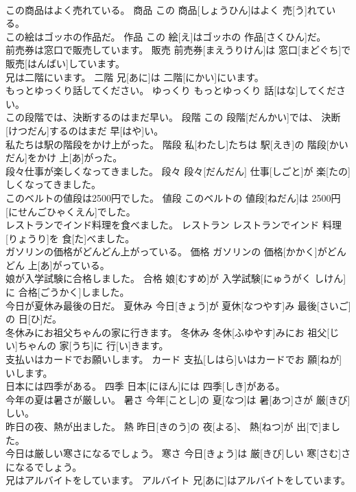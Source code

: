 \documentclass[8pt]{extreport}
\begin{document}
\begin{CJK}{UTF8}{min}
\\	この商品はよく売れている。	商品	この 商品[しょうひん]はよく 売[う]れている。	
\\	この絵はゴッホの作品だ。	作品	この 絵[え]はゴッホの 作品[さくひん]だ。	
\\	前売券は窓口で販売しています。	販売	前売券[まえうりけん]は 窓口[まどぐち]で 販売[はんばい]しています。	
\\	兄は二階にいます。	二階	兄[あに]は 二階[にかい]にいます。	
\\	もっとゆっくり話してください。	ゆっくり	もっとゆっくり 話[はな]してください。	
\\	この段階では、決断するのはまだ早い。	段階	この 段階[だんかい]では、 決断[けつだん]するのはまだ 早[はや]い。	
\\	私たちは駅の階段をかけ上がった。	階段	私[わたし]たちは 駅[えき]の 階段[かいだん]をかけ 上[あ]がった。	
\\	段々仕事が楽しくなってきました。	段々	段々[だんだん] 仕事[しごと]が 楽[たの]しくなってきました。	
\\	このベルトの値段は2500円でした。	値段	このベルトの 値段[ねだん]は 2500円[にせんごひゃくえん]でした。	
\\	レストランでインド料理を食べました。	レストラン	レストランでインド 料理[りょうり]を 食[た]べました。	
\\	ガソリンの価格がどんどん上がっている。	価格	ガソリンの 価格[かかく]がどんどん 上[あ]がっている。	
\\	娘が入学試験に合格しました。	合格	娘[むすめ]が 入学試験[にゅうがく しけん]に 合格[ごうかく]しました。	
\\	今日が夏休み最後の日だ。	夏休み	今日[きょう]が 夏休[なつやす]み 最後[さいご]の 日[ひ]だ。	
\\	冬休みにお祖父ちゃんの家に行きます。	冬休み	冬休[ふゆやす]みにお 祖父[じい]ちゃんの 家[うち]に 行[い]きます。	
\\	支払いはカードでお願いします。	カード	支払[しはら]いはカードでお 願[ねが]いします。	
\\	日本には四季がある。	四季	日本[にほん]には 四季[しき]がある。	
\\	今年の夏は暑さが厳しい。	暑さ	今年[ことし]の 夏[なつ]は 暑[あつ]さが 厳[きび]しい。	
\\	昨日の夜、熱が出ました。	熱	昨日[きのう]の 夜[よる]、 熱[ねつ]が 出[で]ました。	
\\	今日は厳しい寒さになるでしょう。	寒さ	今日[きょう]は 厳[きび]しい 寒[さむ]さになるでしょう。	
\\	兄はアルバイトをしています。	アルバイト	兄[あに]はアルバイトをしています。	

\end{CJK}
\end{document}
